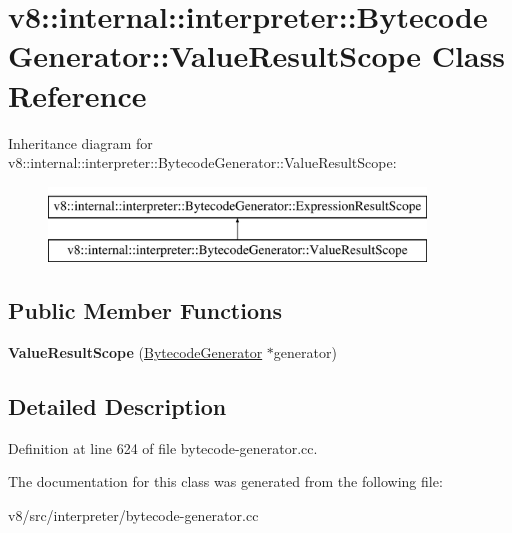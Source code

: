 \hypertarget{classv8_1_1internal_1_1interpreter_1_1BytecodeGenerator_1_1ValueResultScope}{}\section{v8\+:\+:internal\+:\+:interpreter\+:\+:Bytecode\+Generator\+:\+:Value\+Result\+Scope Class Reference}
\label{classv8_1_1internal_1_1interpreter_1_1BytecodeGenerator_1_1ValueResultScope}
Inheritance diagram for v8\+:\+:internal\+:\+:interpreter\+:\+:Bytecode\+Generator\+:\+:Value\+Result\+Scope\+:\begin{figure}[H]
\begin{center}
\leavevmode
\includegraphics[height=2.000000cm]{classv8_1_1internal_1_1interpreter_1_1BytecodeGenerator_1_1ValueResultScope}
\end{center}
\end{figure}
\subsection*{Public Member Functions}
\begin{DoxyCompactItemize}
\item 
\mbox{\label{classv8_1_1internal_1_1interpreter_1_1BytecodeGenerator_1_1ValueResultScope_a2640795521b53df3edbf5aeed36012b5}} 
{\bfseries Value\+Result\+Scope} (\mbox{\hyperlink{classv8_1_1internal_1_1interpreter_1_1BytecodeGenerator}{Bytecode\+Generator}} $\ast$generator)
\end{DoxyCompactItemize}


\subsection{Detailed Description}


Definition at line 624 of file bytecode-\/generator.\+cc.



The documentation for this class was generated from the following file\+:\begin{DoxyCompactItemize}
\item 
v8/src/interpreter/bytecode-\/generator.\+cc\end{DoxyCompactItemize}
